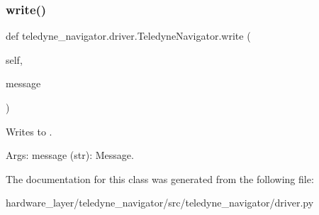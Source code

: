 \subsubsection{\texorpdfstring{write()}{write()}}
{\footnotesize\ttfamily def teledyne\+\_\+navigator.\+driver.\+Teledyne\+Navigator.\+write (\begin{DoxyParamCaption}\item[{}]{self,  }\item[{}]{message }\end{DoxyParamCaption})}

\begin{DoxyVerb}Writes to .

Args:
    message (str): Message.
\end{DoxyVerb}
 

The documentation for this class was generated from the following file\+:\begin{DoxyCompactItemize}
\item 
hardware\+\_\+layer/teledyne\+\_\+navigator/src/teledyne\+\_\+navigator/driver.\+py\end{DoxyCompactItemize}

